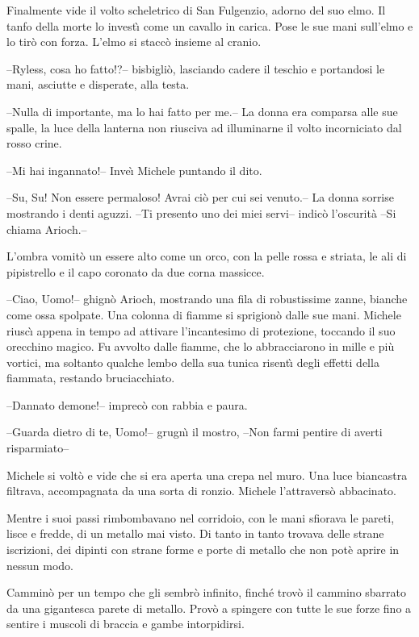 \begin{racconto}
  Finalmente vide il volto scheletrico di San Fulgenzio, adorno del
  suo elmo.  Il tanfo della morte lo invest\`{\i} come un cavallo in
  carica. Pose le sue mani sull'elmo e lo tir\`o con forza. L'elmo
  si stacc\`o insieme al cranio.
  
  --Ryless, cosa ho fatto!?-- bisbigli\`o, lasciando cadere il teschio
  e portandosi le mani, asciutte e disperate, alla testa.
  
  --Nulla di importante, ma lo hai fatto per me.-- La donna era
  comparsa alle sue spalle, la luce della lanterna non riusciva ad
  illuminarne il volto incorniciato dal rosso crine.
  
  --Mi hai ingannato!-- Inve\`{\i} Michele puntando il dito.
  
  --Su, Su! Non essere permaloso! Avrai ci\`o per cui sei venuto.--
  La donna sorrise mostrando i denti aguzzi. --Ti presento uno dei miei
  servi-- indic\`o l'oscurit\`a --Si chiama Arioch.--
  
  L'ombra vomit\`o un essere alto come un orco, con la pelle rossa e
  striata, le ali di pipistrello e il capo coronato da due corna
  massicce.
  
  --Ciao, Uomo!-- ghign\`o Arioch, mostrando una fila di robustissime
  zanne, bianche come ossa spolpate. Una colonna di fiamme si
  sprigion\`o dalle sue mani. Michele riusc\`{\i} appena in tempo ad
  attivare l'incantesimo di protezione, toccando il suo orecchino
  magico. Fu avvolto dalle fiamme, che lo abbracciarono in mille e
  pi\`u vortici, ma soltanto qualche lembo della sua tunica
  risent\`{\i} degli effetti della fiammata, restando bruciacchiato.
  
  --Dannato demone!-- imprec\`o con rabbia e paura.
  
  --Guarda dietro di te, Uomo!-- grugn\`{\i} il mostro, --Non farmi
  pentire di averti risparmiato--
  
  Michele si volt\`o e vide che si era aperta una crepa nel muro.
  Una luce biancastra filtrava, accompagnata da una sorta di ronzio.
  Michele l'attravers\`o abbacinato.
  
  Mentre i suoi passi rimbombavano nel corridoio, con le mani sfiorava
  le pareti, lisce e fredde, di un metallo mai visto. Di tanto in
  tanto trovava delle strane iscrizioni, dei dipinti con strane forme
  e porte di metallo che non pot\`e aprire in nessun modo.
  
  Cammin\`o per un tempo che gli sembr\`o infinito, finch\'e
  trov\`o il cammino sbarrato da una gigantesca parete di metallo.
  Prov\`o a spingere con tutte le sue forze fino a sentire i muscoli
  di braccia e gambe intorpidirsi.
  

\end{racconto}
